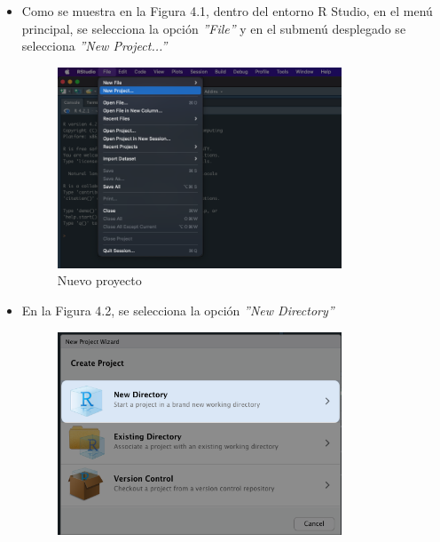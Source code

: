 \begin{itemize}
    \item Como se muestra en la Figura 4.1, dentro del entorno R Studio, en el men\'u principal, se selecciona la opci\'on \textit{''File''} y en el submen\'u desplegado se selecciona \textit{''New Project...''}
    \begin{figure}[H]
        \centering
          \begin{minipage}{0.8\textwidth}
            \centering
            \includegraphics[width=0.8\textwidth]{figure_4_1.png}
            \caption{Nuevo proyecto}
            \label{fig:descripcion}
          \end{minipage}%
          \hspace{5mm}
    \end{figure}
    \item En la Figura 4.2, se selecciona la opci\'on \textit{''New Directory''}
    \begin{figure}[H]
        \centering
          \begin{minipage}{0.8\textwidth}
            \centering
            \includegraphics[width=0.8\textwidth]{figure_4_2.png}

\end{minipage}
\end{figure}
\end{itemize}
